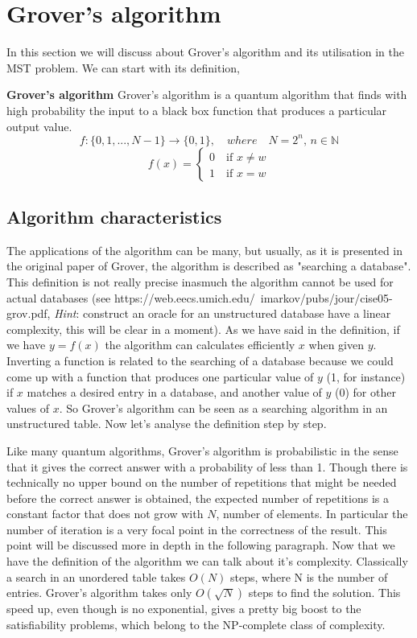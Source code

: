 \documentclass[main.tex]{subfiles}
\begin{document}
\section{Grover's algorithm}
In this section we will discuss about Grover's algorithm and its 
utilisation in the MST problem.
We can start with its definition,
\theoremstyle{definition}
	\begin{definition}{\textbf{Grover's algorithm}}
	Grover's algorithm is a quantum algorithm that finds with high 
	probability the input to a black box function that produces a 
	particular output value.
	$$f:\{0, 1, ..., N-1\}\rightarrow\{0,1\},\quad where \quad N=2^{n}\textit{, }n\in\mathbb{N}$$ 
	\[
    f(x)=\left\{
                \begin{array}{ll}
                  0 \quad\text{if }x \neq w\\
                  1 \quad\text{if }x = w
                \end{array}
              \right.
  \]
	\end{definition}
	
	\subsection{Algorithm characteristics}
The applications of the algorithm can be many, but usually, as it is presented in the original paper of Grover, the algorithm
is described as "searching a database". This definition is not really precise inasmuch the algorithm cannot be used for actual databases (see https://web.eecs.umich.edu/~imarkov/pubs/jour/cise05-grov.pdf, \textit{Hint}: construct an oracle for an unstructured database have a linear complexity, this will be clear in a moment). As we have said in the definition, if we have $y=f(x)$ the algorithm can calculates efficiently $x$ when given $y$.
Inverting a function is related to the searching of a database because we could come up with a function that produces one particular value of $y$ (1, for instance) if $x$ matches a desired entry in a database, and another value of $y$ (0) for other values of $x$. So Grover's algorithm can be seen as a searching algorithm in an unstructured table.
Now let's analyse the definition step by step. 

Like many quantum algorithms, Grover's algorithm is probabilistic in the sense that it 
gives the correct answer with a probability of less than 1. Though there is technically no upper bound on the number of repetitions that might be needed before the correct answer is obtained, the expected number of repetitions is a constant factor that does not grow with $N$, number of elements.
In particular the number of iteration is a very focal point in the correctness of the result. This point will be discussed more in depth in the following paragraph.
Now that we have the definition of the algorithm we can talk about it's complexity. Classically a search in an unordered table takes $O(N)$ steps, where N is the number of entries. Grover's algorithm takes only $O(\sqrt{N})$ steps to find the solution. This speed up, even though is no exponential, gives a pretty big boost to the satisfiability problems, which belong to the NP-complete class of complexity.
\end{document}
